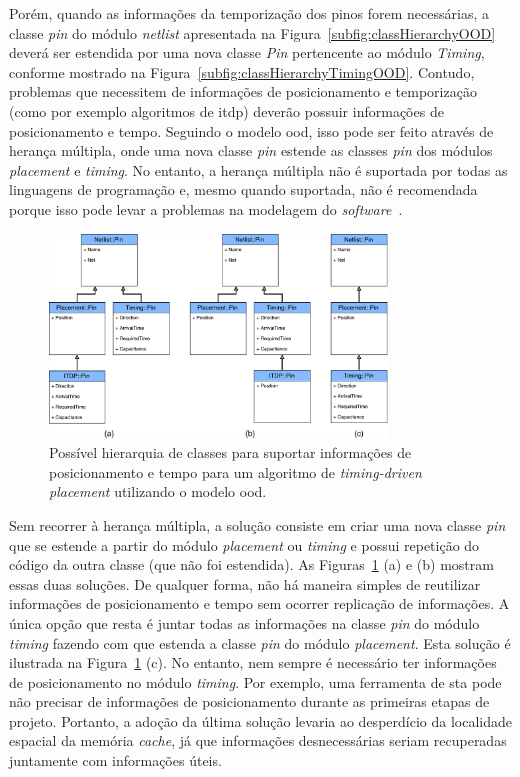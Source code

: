 Porém, quando as informações da temporização dos pinos forem necessárias, a classe \textit{pin} do módulo \textit{netlist} apresentada na Figura~\ref{subfig:classHierarchyOOD} deverá ser estendida 
por uma nova classe \textit{Pin} pertencente ao módulo \textit{Timing}, conforme mostrado na Figura~\ref{subfig:classHierarchyTimingOOD}.
Contudo, problemas que necessitem de informações de posicionamento e temporização (como por exemplo algoritmos de \ac{itdp}) deverão possuir informações de posicionamento e tempo.
Seguindo o modelo \ac{ood}, isso pode ser feito através de herança múltipla, onde uma nova classe \textit{pin} estende as classes \textit{pin} dos módulos \textit{placement} e \textit{timing}.
No entanto, a herança múltipla não é suportada por todas as linguagens de programação e, mesmo quando suportada, não é recomendada porque isso pode levar a problemas na modelagem do \textit{software}~\cite{nystrom2014game}.

\begin{figure}[h!b]
    \centering
    \includegraphics[width=0.8\textwidth]{img/introducao/ITDPsolutionOOD.pdf}
    \caption[Hierarquia de classes]{Possível hierarquia de classes para suportar informações de posicionamento e tempo para um algoritmo de \textit{timing-driven placement} utilizando o  modelo \ac{ood}.}
    \label{fig:classITDP}
\end{figure}

Sem recorrer à herança múltipla, a solução consiste em criar uma nova classe \textit{pin} que se estende a partir do módulo \textit{placement} ou \textit{timing} e possui repetição do código da outra classe (que não foi estendida). As Figuras~\ref{fig:classITDP} (a) e (b) mostram essas duas soluções. De qualquer forma, não há maneira simples de reutilizar informações de posicionamento e tempo sem ocorrer replicação de informações. A única opção que resta é juntar todas as informações na classe \textit{pin} do módulo \textit{timing} fazendo com que estenda a classe \textit{pin} do módulo \textit{placement}. Esta solução é ilustrada na Figura~\ref{fig:classITDP} (c). No entanto, nem sempre é necessário ter informações de posicionamento no módulo \textit{timing}. Por exemplo, uma ferramenta de \ac{sta} pode não precisar de informações de posicionamento durante as primeiras etapas de projeto. Portanto, a adoção da última solução levaria ao desperdício da localidade espacial da memória \textit{cache}, já que informações desnecessárias seriam recuperadas juntamente com informações úteis.





